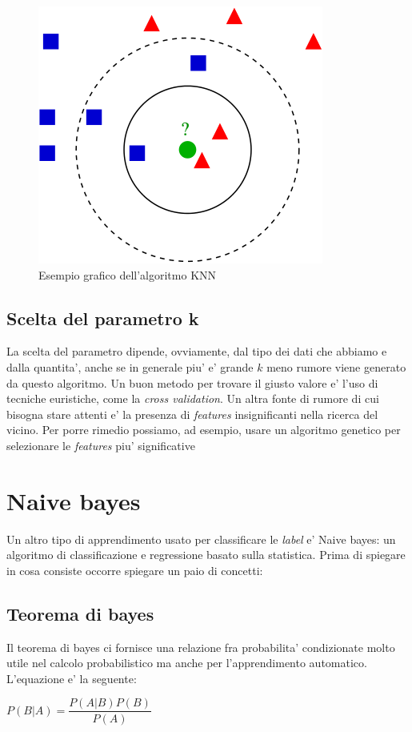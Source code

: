 \begin{figure}[H]
	\centering
	\includegraphics[width=0.7\linewidth]{img/knn_example}
	\caption{Esempio grafico dell'algoritmo KNN}
	\label{fig:knnexample}
\end{figure}


\subsection{Scelta del parametro k}
La scelta del parametro dipende, ovviamente, dal tipo dei dati che abbiamo e dalla quantita', anche se in generale piu' e' grande $k$ meno rumore viene generato da questo algoritmo. Un buon metodo per trovare il giusto valore e' l'uso di tecniche euristiche, come la \textit{cross validation}. Un altra fonte di rumore di cui bisogna stare attenti e' la presenza di \textit{features} insignificanti nella ricerca del vicino. Per porre rimedio possiamo, ad esempio, usare un algoritmo genetico per selezionare le \textit{features} piu' significative

\section{Naive bayes}
Un altro tipo di apprendimento usato per classificare le \textit{label} e' Naive bayes: un algoritmo di classificazione e regressione basato sulla statistica. Prima di spiegare in cosa consiste occorre spiegare un paio di concetti:
\subsection{Teorema di bayes}
Il teorema di bayes ci fornisce una relazione fra probabilita' condizionate molto utile nel calcolo probabilistico ma anche per l'apprendimento automatico. L'equazione e' la seguente:
\begin{center}
	$P(B|A) = \dfrac{P(A|B)P(B)}{P(A)}$
\end{center}
